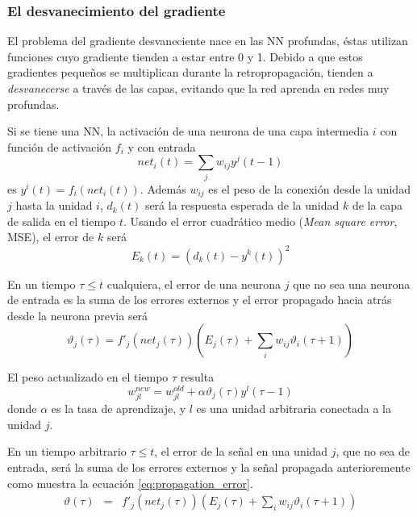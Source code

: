 \subsubsection{El desvanecimiento del gradiente}
El problema del gradiente desvaneciente nace en las NN profundas, éstas utilizan funciones cuyo gradiente tienden a estar entre 0 y 1. Debido a que estos gradientes pequeños se multiplican durante la retropropagación, tienden a {\em desvanecerse} a través de las capas, evitando que la red aprenda en redes muy profundas.

Si se tiene una NN, la activación de una neurona de una capa intermedia $i$ con función de activación $f_i$ y con entrada $$ net_{i}(t) = \sum_{j}w_{ij}y^{j}(t - 1) $$ es $y^{i}(t) = f_{i}(net_{i}(t))$. Además $w_{ij}$ es el peso de la conexión desde la unidad $j$ hasta la unidad $i$, $d_{k}(t)$ será la respuesta esperada de la unidad $k$ de la capa de salida en el tiempo $t$. Usando el error cuadrático medio ({\em Mean square error}, MSE), el error de $k$ será
$$ E_{k}(t) = (d_{k}(t) - y^{k}(t))^2 $$

En un tiempo $\tau \leq t$ cualquiera, el error de una neurona $j$ que no sea una neurona de entrada es la suma de los errores externos y el error propagado hacia atrás desde la neurona previa será
$$ \vartheta_{j}(\tau) = f'_{j}(net_{j}(\tau))\left(E_{j}(\tau) + \sum_{i} w_{ij}\vartheta_{i}(\tau + 1)\right) $$

El peso actualizado en el tiempo $\tau$ resulta
$$ w_{jl}^{new} = w_{jl}^{old} + \alpha\vartheta_{j}(\tau) y^{l}(\tau - 1)$$
donde $\alpha$ es la tasa de aprendizaje, y $l$ es una unidad arbitraria conectada a la unidad $j$.

En un tiempo arbitrario $\tau \leq t$, el error de la señal en una unidad $j$, que no sea de entrada, será la suma de los errores externos y la señal propagada anterioremente como muestra la ecuación \ref{eq:propagation_error}.
\begin{eqnarray}
	\vartheta(\tau) &=& f'_{j}(net_{j}(\tau)) \left(E_{j}(\tau) + \sum_{i}w_{ij}\vartheta_{i}(\tau + 1)\right)
	\label{eq:propagation_error}
\end{eqnarray}


